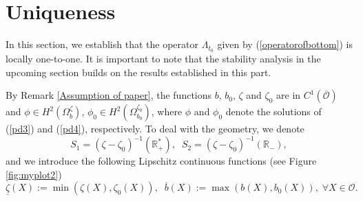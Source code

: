 \documentclass[11pt]{article}
\begin{document}
\section{ Uniqueness }\label{sec:uniqueness}
In this section, we establish that the operator $\Lambda_{t_0}$ given by  (\ref{operatorofbottom}) is locally one-to-one. It is important to note that the stability analysis in the upcoming section builds on the results established in this part.


By  Remark \ref{Assumption of paper}, the functions $b$, $b_0$, $\zeta$ and $\zeta_0$ are  in $C^1\left(\overline{\mathcal O }\right)$ and $\phi\in H^2(\Omega^{\zeta}_{b})$, $\phi_0\in H^2(\Omega^{\zeta_0}_{b_0})$, where $\phi$ and $\phi_0$  denote the solutions of (\ref{pd3}) and (\ref{pd4}), respectively. To deal with the geometry, we denote  
\begin{equation}\label{defs1ands2}
	S_1=(\zeta-\zeta_0)^{-1}(\mathbb{R}^*_{+}),\;\;S_2=(\zeta-\zeta_0)^{-1}(\mathbb{R}_{-}),
\end{equation}
and we introduce the following Lipschitz continuous functions (see Figure \ref{fig:myplot2})
\begin{equation}\label{defunderlinezetaandb}
	\underline{\zeta}(X) :=\min(\zeta(X),\zeta_0(X)),\;\;\overline{b}(X) :=\max(b(X),b_0(X)),\;\forall X\in \mathcal O .
\end{equation}
\end{document}
